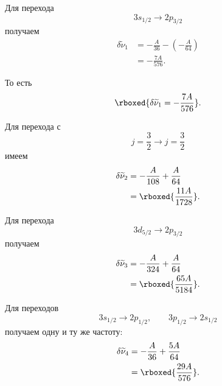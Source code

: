 \documentclass[../final.tex]{subfiles}
\begin{document}
Для перехода
%
\begin{equation*}
    3s_{1/2}
    \rightarrow
    2p_{3/2}
\end{equation*}
%
получаем
%
\begin{align*}
    \delta\widetilde{\nu}_1
    &=
    -\frac{A}{36}
    -
    \left(
        -\frac{A}{64}
    \right)
    \\
    &=
    -\frac{7A}{576}.
\end{align*}

То есть
%
\begin{equation*}
    \rboxed{
        \delta\widetilde{\nu}_1
        =
        -\frac{7A}{576}
    }.
\end{equation*}



Для перехода с
%
\begin{equation*}
    j=\frac32
    \rightarrow
    j=\frac32
\end{equation*}
%
имеем
%
\begin{align*}
    \delta\widetilde{\nu}_2
    &=
    -\frac{A}{108}
    +
    \frac{A}{64}
    \\
    &=
    \rboxed{
        \frac{11A}{1728}
    }.
\end{align*}



Для перехода
%
\begin{equation*}
    3d_{5/2}
    \rightarrow
    2p_{3/2}
\end{equation*}
%
получаем
%
\begin{align*}
    \delta\widetilde{\nu}_3
    &=
    -\frac{A}{324}
    +
    \frac{A}{64}
    \\
    &=
    \rboxed{
        \frac{65A}{5184}
    }.
\end{align*}



Для переходов
%
\begin{equation*}
    3s_{1/2}\rightarrow2p_{1/2},
    \qquad
    3p_{1/2}\rightarrow2s_{1/2}
\end{equation*}
%
получаем одну и ту же частоту:
%
\begin{align*}
    \delta\widetilde{\nu}_4
    &=
    -\frac{A}{36}
    +
    \frac{5A}{64}
    \\
    &=
    \rboxed{
        \frac{29A}{576}
    }.
\end{align*}
\end{document}
